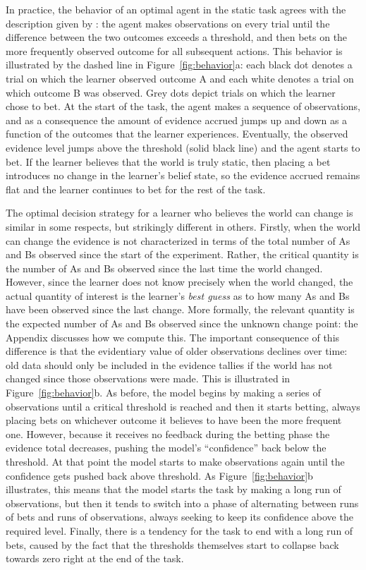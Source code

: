 \documentclass[authoryear]{elsarticle}
\begin{document}
In practice, the behavior of an optimal agent in the static task agrees with the description given by \citet{tversky_information_1966}: the agent makes observations on every trial until the difference between the two outcomes exceeds a threshold, and then bets on the more frequently observed outcome for all subsequent actions. This behavior is illustrated by the dashed line in Figure~\ref{fig:behavior}a: each black dot denotes a trial on which the learner observed outcome A and each white denotes a trial on which outcome B was observed. Grey dots depict trials on which the learner chose to bet. At the start of the task, the agent makes a sequence of observations, and as a consequence the amount of evidence accrued jumps up and down as a function of the outcomes that the learner experiences. Eventually, the observed evidence level jumps above the threshold (solid black line) and the agent starts to bet. If the learner believes that the world is truly static, then placing a bet introduces no change in the learner's belief state, so the evidence accrued remains flat and the learner continues to bet for the rest of the task.

The optimal decision strategy for a learner who believes the world can change is similar in some respects, but strikingly different in others. Firstly, when the world can change the evidence is not characterized in terms of the total number of As and Bs observed since the start of the experiment. Rather, the critical quantity is the number of As and Bs observed since the last time the world changed. However, since the learner does not know precisely when the world changed, the actual quantity of interest is the learner's {\it best guess} as to how many As and Bs have been observed since the last change. More formally, the relevant quantity is the expected number of As and Bs observed since the unknown change point: the Appendix discusses how we compute this. The important consequence of this difference is that the evidentiary value of older observations declines over time: old data should only be included in the evidence tallies if the world has not changed since those observations were made. This is illustrated in Figure~\ref{fig:behavior}b. As before, the model begins by making a series of observations until a critical threshold is reached and then it starts betting, always placing bets on whichever outcome it believes to have been the more frequent one. However, because it receives no feedback during the betting phase the evidence total decreases, pushing the model's ``confidence'' back below the threshold. At that point the model starts to make observations again until the confidence gets pushed back above threshold. As Figure~\ref{fig:behavior}b illustrates, this means that the model starts the task by making a long run of observations, but then it tends to switch into a phase of alternating between runs of bets and runs of observations, always seeking to keep its confidence above the required level. Finally, there is a tendency for the task to end with a long run of bets, caused by the fact that the thresholds themselves start to collapse back towards zero right at the end of the task.
\end{document}
